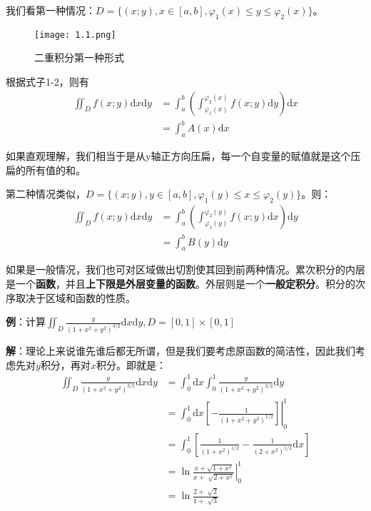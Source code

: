 \documentclass{ctexart}
\let\oldtextbf\textbf
\renewcommand{\textbf}[1]{\textcolor{brown!50!red}{\oldtextbf{#1}}}
\begin{document}
我们看第一种情况：$D=\{(x;y),x\in[a,b],\varphi_1(x)\leq y\leq \varphi_2(x)\}$。

\begin{figure}[H]    
\centering     
\renewcommand{\figurename}{图}     
\renewcommand{\thefigure}{1.1}    
\begin{myimagebox}[width=0.36\textwidth] %
\texttt{[image: 1.1.png]} %
\end{myimagebox}     
\caption{\label{fig:1.1}二重积分第一种形式}   
\end{figure}

根据式子1-2，则有
\begin{align*}
    \iint_D f(x;y)\mathrm{d}x\mathrm{d}y&=\int_a^b\left
 ( \int_{\varphi_1(x)}^{\varphi_2(x)} f(x;y)\mathrm{d}y  \right) \mathrm{d}x
\\&=\int_a^b A(x)\mathrm{d}x \tag{1-3}
\end{align*}

如果直观理解，我们相当于是从y轴正方向压扁，每一个自变量的赋值就是这个压扁的所有值的和。

第二种情况类似，$D=\{(x;y),y\in[a,b],\varphi_1(y)\leq x\leq \varphi_2(y)\}$。则：
\begin{align*}
    \iint_D f(x;y)\mathrm{d}x\mathrm{d}y&=\int_a^b\left
 ( \int_{\varphi_1(y)}^{\varphi_2(y)} f(x;y)\mathrm{d}x  \right) \mathrm{d}y
\\&=\int_a^b B(y)\mathrm{d}y \tag{1-4}
\end{align*}

如果是一般情况，我们也可对区域做出切割使其回到前两种情况。累次积分的内层是一个\textbf{\color{brown!50!red}函数}，并且\textbf{\color{brown!50!red}上下限是外层变量的函数}。外层则是一个\textbf{\color{brown!50!red}一般定积分}。积分的次序取决于区域和函数的性质。

\textbf{\color{brown!50!red}例}：计算$\iint_D\frac{y}{(1+x^2+y^2)^{3/2}}\mathrm{d}x\mathrm{d}y,D=[0,1]\times[0,1]$

\textbf{\color{brown!50!red}解}：理论上来说谁先谁后都无所谓，但是我们要考虑原函数的简洁性，因此我们考虑先对$y$积分，再对$x$积分。即就是：
    \begin{align*}
    \iint_D\frac{y}{(1+x^2+y^2)^{3/2}}\mathrm{d}x\mathrm{d}y&=
\int_0^1\mathrm{d}x\int_0^1 \frac{y}{(1+x^2+y^2)^{3/2}}\mathrm{d}y\\
&=\int_0^1 \mathrm{d}x \left.[ -\frac{1}{(1+x^2+y^2)^{1/2}} ]\right| _0^1 \\
&=\int_0^1\left [ \frac{1}{(1+x^2)^{1/2}}-\frac{1}{(2+x^2)^{1/2}}\mathrm{d}x    \right ] \\
&=\left.\ln\frac{x+\sqrt{1+x^2}}{x+\sqrt[]{2+x^2} } \right| _0^1\\
&=\ln \frac{2+\sqrt[]{2} }{1+\sqrt[]{3} }
\end{align*}
\end{document}
